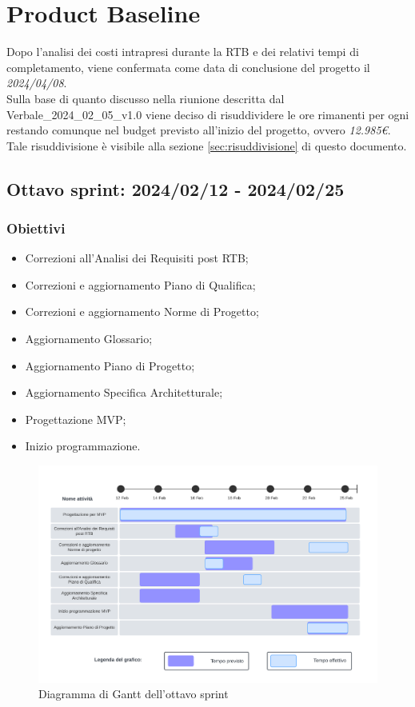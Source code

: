 \section{Product Baseline}
Dopo l'analisi dei costi intrapresi durante la RTB e dei relativi tempi di completamento, viene confermata come data di conclusione del progetto il \textit{2024/04/08}.\\Sulla base di quanto discusso nella riunione descritta dal Verbale\_2024\_02\_05\_v1.0 viene deciso di risuddividere le ore rimanenti per ogni  restando comunque nel budget previsto all'inizio del progetto, ovvero \textit{12.985€}.\\Tale risuddivisione è visibile alla sezione \ref{sec:risuddivisione} di questo documento.
\newpage

\subsection{Ottavo sprint: 2024/02/12 - 2024/02/25}
\subsubsection{Obiettivi}
\begin{itemize}[itemsep=-2pt]
    \item Correzioni all'Analisi dei Requisiti post RTB;
    \item Correzioni e aggiornamento Piano di Qualifica;
    \item Correzioni e aggiornamento Norme di Progetto;
    \item Aggiornamento Glossario;
    \item Aggiornamento Piano di Progetto;
    \item Aggiornamento Specifica Architetturale;
    \item Progettazione MVP;
    \item Inizio programmazione.
\end{itemize}

\begin{figure}[h!]
    \centering  
    \includegraphics[width=\textwidth]{Roadmap8sprint.png}
    \caption{Diagramma di Gantt dell'ottavo sprint}
    \label{fig:roadmap8s}
\end{figure}
\newpage

